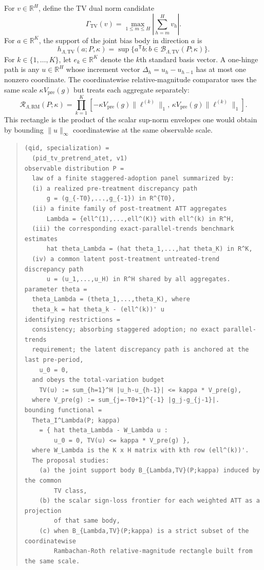 \documentclass[11pt]{article}
\newcommand{\transpose}{\mathsf{T}}
\newcommand{\R}{\mathbb{R}}
\theoremstyle{definition}
\theoremstyle{plain}
\theoremstyle{remark}
\begin{document}
For \(v\in\R^H\), define the TV dual norm candidate
\[
\Gamma_{\mathrm{TV}}(v)
=
\max_{1\le m\le H}\left|
\sum_{h=m}^H v_h
\right|.
\]
For \(a\in\R^K\), the support of the joint bias body in direction \(a\) is
\[
h_{\Lambda,\mathrm{TV}}(a;P,\kappa)
=
\sup\{a^\transpose b: b\in\mathcal B_{\Lambda,\mathrm{TV}}(P;\kappa)\}.
\]
For \(k\in\{1,\ldots,K\}\), let \(e_k\in\R^K\) denote the \(k\)th standard basis vector. A one-hinge path is any \(u\in\R^H\) whose increment vector \(\Delta_h=u_h-u_{h-1}\) has at most one nonzero coordinate.
The coordinatewise relative-magnitude comparator uses the same scale \( \kappa V_{\mathrm{pre}}(g)\) but treats each aggregate separately:
\[
\mathcal R_{\Lambda,\mathrm{RM}}(P;\kappa)
=
\prod_{k=1}^K
\left[
-\kappa V_{\mathrm{pre}}(g)\|\ell^{(k)}\|_1,\,
\kappa V_{\mathrm{pre}}(g)\|\ell^{(k)}\|_1
\right].
\]
This rectangle is the product of the scalar sup-norm envelopes one would obtain by bounding \(\|u\|_\infty\) coordinatewise at the same observable scale.

\begin{quote}
\begin{verbatim}
(qid, specialization) =
  (pid_tv_pretrend_atet, v1)
observable distribution P =
  law of a finite staggered-adoption panel summarized by:
  (i) a realized pre-treatment discrepancy path
      g = (g_{-T0},...,g_{-1}) in R^{T0},
  (ii) a finite family of post-treatment ATT aggregates
      Lambda = {ell^(1),...,ell^(K)} with ell^(k) in R^H,
  (iii) the corresponding exact-parallel-trends benchmark estimates
      hat theta_Lambda = (hat theta_1,...,hat theta_K) in R^K,
  (iv) a common latent post-treatment untreated-trend discrepancy path
      u = (u_1,...,u_H) in R^H shared by all aggregates.
parameter theta =
  theta_Lambda = (theta_1,...,theta_K), where
  theta_k = hat theta_k - (ell^(k))' u
identifying restrictions =
  consistency; absorbing staggered adoption; no exact parallel-trends
  requirement; the latent discrepancy path is anchored at the last pre-period,
    u_0 = 0,
  and obeys the total-variation budget
    TV(u) := sum_{h=1}^H |u_h-u_{h-1}| <= kappa * V_pre(g),
  where V_pre(g) := sum_{j=-T0+1}^{-1} |g_j-g_{j-1}|.
bounding functional =
  Theta_I^Lambda(P; kappa)
    = { hat theta_Lambda - W_Lambda u :
        u_0 = 0, TV(u) <= kappa * V_pre(g) },
  where W_Lambda is the K x H matrix with kth row (ell^(k))'.
  The proposal studies:
    (a) the joint support body B_{Lambda,TV}(P;kappa) induced by the common
        TV class,
    (b) the scalar sign-loss frontier for each weighted ATT as a projection
        of that same body,
    (c) when B_{Lambda,TV}(P;kappa) is a strict subset of the coordinatewise
        Rambachan-Roth relative-magnitude rectangle built from the same scale.
\end{verbatim}
\end{quote}
\end{document}
